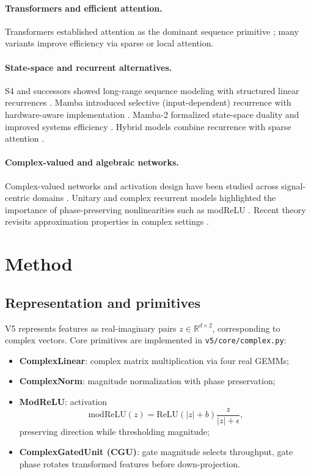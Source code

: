 \documentclass[11pt]{article}
\begin{document}
\paragraph{Transformers and efficient attention.}
Transformers established attention as the dominant sequence primitive \citep{vaswani2017attention}; many variants improve efficiency via sparse or local attention.

\paragraph{State-space and recurrent alternatives.}
S4 and successors showed long-range sequence modeling with structured linear recurrences \citep{gu2021s4}. Mamba introduced selective (input-dependent) recurrence with hardware-aware implementation \citep{gu2023mamba}. Mamba-2 formalized state-space duality and improved systems efficiency \citep{dao2024transformersaressms}. Hybrid models combine recurrence with sparse attention \citep{de2024griffin,jamba2024}.

\paragraph{Complex-valued and algebraic networks.}
Complex-valued networks and activation design have been studied across signal-centric domains \citep{trabelsi2018deepcomplex}. Unitary and complex recurrent models highlighted the importance of phase-preserving nonlinearities such as modReLU \citep{arjovsky2016unitary}. Recent theory revisits approximation properties in complex settings \citep{cvnnuniversal2025}.

\section{Method}
\subsection{Representation and primitives}
V5 represents features as real-imaginary pairs $z \in \mathbb{R}^{d \times 2}$, corresponding to complex vectors.
Core primitives are implemented in \texttt{v5/core/complex.py}:
\begin{itemize}[leftmargin=1.2em]
  \item \textbf{ComplexLinear}: complex matrix multiplication via four real GEMMs;
  \item \textbf{ComplexNorm}: magnitude normalization with phase preservation;
  \item \textbf{ModReLU}: activation
  \begin{equation}
    \mathrm{modReLU}(z)=\mathrm{ReLU}(|z|+b)\frac{z}{|z|+\epsilon},
  \end{equation}
  preserving direction while thresholding magnitude;
  \item \textbf{ComplexGatedUnit (CGU)}: gate magnitude selects throughput, gate phase rotates transformed features before down-projection.
\end{itemize}
\end{document}
